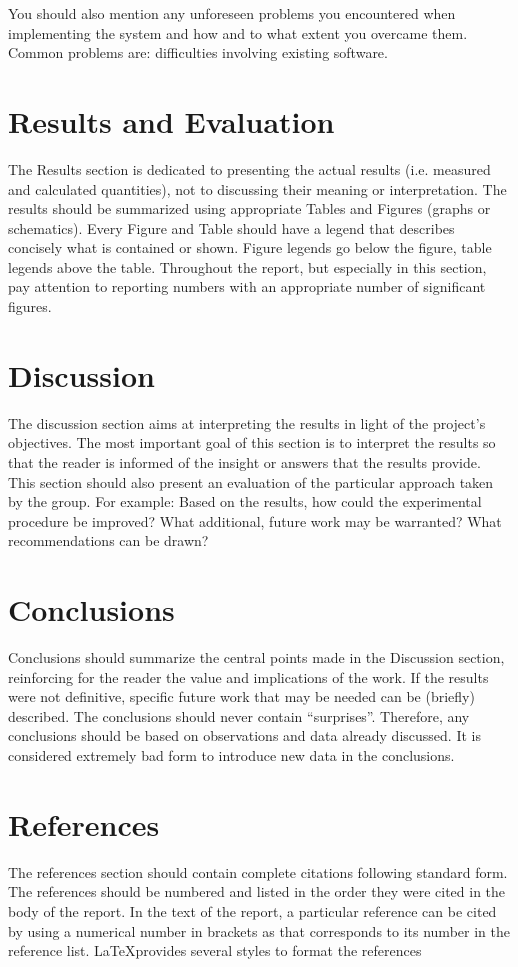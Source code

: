 You should also mention any unforeseen problems you encountered when implementing the
system and how and to what extent you overcame them. Common problems are:
 difficulties involving existing software.


\section{Results and Evaluation}
The Results section is dedicated to presenting the actual results (i.e. measured and calculated quantities), not to discussing their meaning or interpretation. The results should be summarized using appropriate Tables and Figures (graphs or schematics). Every Figure and Table should have a legend that describes concisely what is contained or shown. Figure legends go below the figure, table legends above the table. Throughout the report, but especially in this section, pay attention to reporting numbers with an appropriate number of significant figures. 

\section{Discussion}
The discussion section aims at interpreting the results in light of the project's objectives. The most important goal of this section is to interpret the results so that the reader is informed of the insight or answers that the results provide. This section should also present an evaluation of the particular approach taken by the group. For example: Based on the results, how could the experimental procedure be improved? What additional, future work may be warranted? What recommendations can be drawn?


\section{Conclusions}
Conclusions should summarize the central points made in the Discussion section, reinforcing for the reader the value and implications of the work. If the results were not definitive, specific future work that may be needed can be (briefly) described. The conclusions should never contain ``surprises''. Therefore, any conclusions should be based on observations and data already discussed. It is considered extremely bad form to introduce new data in the conclusions.

\section*{References}

The references section should contain complete citations following standard form.  The references should be numbered and listed in the order they were cited in the body of the report. In the text of the report, a particular reference can be cited by using a numerical number in brackets as \cite{Lee2015} that corresponds to its number in the reference list. \LaTeX provides several styles to format the references




